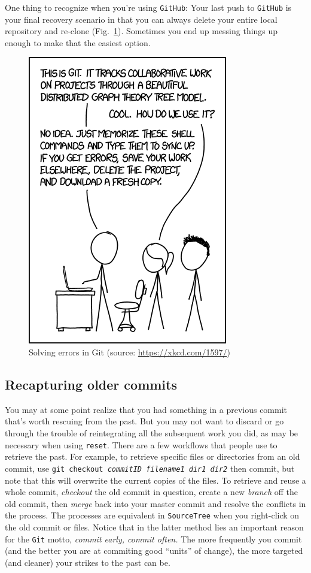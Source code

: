 \documentclass[12pt,letterpaper]{article}
\begin{document}
One thing to recognize when you're using \texttt{GitHub}:
Your last push to \texttt{GitHub} is your final recovery scenario in that you can always delete your entire local repository and re-clone (Fig.~\ref{fig:gitreset}).
Sometimes you end up messing things up enough to make that the easiest option.

\begin{figure}[h]
	\centering
	\includegraphics[width=0.5\linewidth]{figs/gitreset.png}
	\caption{Solving errors in Git (source: \url{https://xkcd.com/1597/})}
	\label{fig:gitreset}
\end{figure}



\subsection{Recapturing older commits}
You may at some point realize that you had something in a previous commit that's worth rescuing from the past. But you may not want to discard or go through the trouble of reintegrating all the subsequent work you did, as may be necessary when using \texttt{reset}.
There are a few workflows that people use to retrieve the past.
For example, to retrieve specific files or directories from an old commit, use
\texttt{git checkout \emph{commitID} \emph{filename1} \emph{dir1} \emph{dir2}} then commit, but note that this will overwrite the current copies of the files.
To retrieve and reuse a whole commit, \emph{checkout} the old commit in question, create a new \emph{branch} off the old commit, then \emph{merge} back into your master commit and resolve the conflicts in the process.
The processes are equivalent in \texttt{SourceTree} when you right-click on the old commit or files.
Notice that in the latter method lies an important reason for the \texttt{Git} motto, \emph{commit early, commit often.}
The more frequently you commit (and the better you are at commiting good ``units'' of change), the more targeted (and cleaner) your strikes to the past can be.
\end{document}
